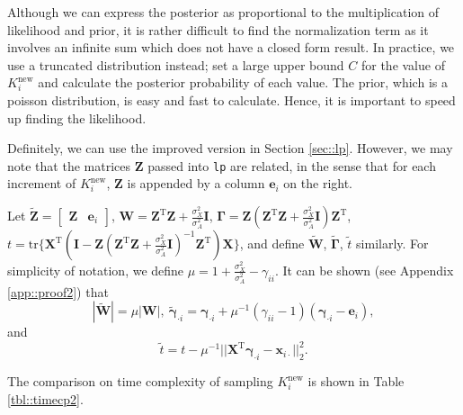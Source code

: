 \documentclass{article}
\begin{document}
Although we can express the posterior as proportional to the multiplication of likelihood and prior, it is rather difficult to find the normalization term as it involves an infinite sum which does not have a closed form result. In practice, we use a truncated distribution instead; set a large upper bound $C$ for the value of $K_i^\text{new}$ and calculate the posterior probability of each value. The prior, which is a poisson distribution, is easy and fast to calculate. Hence, it is important to speed up finding the likelihood.

Definitely, we can use the improved version in Section \ref{sec::lp}. However, we may note that the matrices $\mathbf{Z}$ passed into \texttt{lp} are related, in the sense that for each increment of $K_i^\text{new}$, $\mathbf{Z}$ is appended by a column $\boldsymbol{e}_i$ on the right.

Let $\widetilde{\mathbf{Z}} = \begin{bmatrix}
  \mathbf{Z} & \boldsymbol{e}_i
\end{bmatrix}$, $\mathbf{W} = {\mathbf{Z}}^{\mathrm{T}}\mathbf{Z}+\frac{\sigma_X^2}{\sigma_A^2}\mathbf{I}$, $\mathbf{\Gamma} = \mathbf{Z}({\mathbf{Z}}^{\mathrm{T}}\mathbf{Z}+\frac{\sigma_X^2}{\sigma_A^2}\mathbf{I}){\mathbf{Z}}^{\mathrm{T}}$, $t = \mathrm{tr}\{{\mathbf{X}}^{\mathrm{T}}(\mathbf{I}-\mathbf{Z}({\mathbf{Z}}^{\mathrm{T}}\mathbf{Z}+\frac{\sigma_X^2}{\sigma_A^2}\mathbf{I})^{-1}{\mathbf{Z}}^{\mathrm{T}})\mathbf{X}\}$, and define $\widetilde{\mathbf{W}}$, $\widetilde{\mathbf{\Gamma}}$, $\widetilde{t}$ similarly. For simplicity of notation, we define $\mu = 1 + \frac{\sigma_X^2}{\sigma_A^2} - \gamma_{ii}$. It can be shown (see Appendix \ref{app::proof2}) that \begin{equation}|\widetilde{\mathbf{W}}| = \mu|\mathbf{W}|,~\widetilde{\boldsymbol{\gamma}}_{\cdot i} = \boldsymbol{\gamma}_{\cdot i} + \mu^{-1}(\gamma_{ii} - 1)(\boldsymbol{\gamma}_{\cdot i} - \boldsymbol{e}_i),\end{equation}
and
\begin{equation}\widetilde{t} = t - \mu^{-1}||\mathbf{X}^\mathrm{T}\boldsymbol{\gamma}_{\cdot i} - \boldsymbol{x}_{i\cdot}||_2^2.\end{equation}

  The comparison on time complexity of sampling $K_i^\text{new}$ is shown in Table \ref{tbl::timecp2}.
\end{document}
